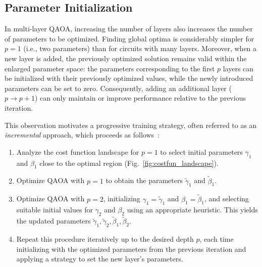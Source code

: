 \subsection{Parameter Initialization}
\label{Section:IncrementalApproach}

In multi-layer QAOA, increasing the number of layers also increases the number of parameters to be optimized. Finding global optima is considerably simpler for $p=1$ (i.e., two parameters) than for circuits with many layers. Moreover, when a new layer is added, the previously optimized solution remains valid within the enlarged parameter space: the parameters corresponding to the first $p$ layers can be initialized with their previously optimized values, while the newly introduced parameters can be set to zero. Consequently, adding an additional layer ($p \rightarrow p+1$) can only maintain or improve performance relative to the previous iteration.

This observation motivates a progressive training strategy, often referred to as an \emph{incremental} approach, which proceeds as follows~\cite{zhou_quantum_2020}:
\begin{enumerate}
    \item Analyze the cost function landscape for $p=1$ to select initial parameters $\gamma_1$ and $\beta_1$ close to the optimal region (Fig.~\ref{fig:costfun_landscape}).
    \item Optimize QAOA with $p=1$ to obtain the parameters $\widetilde{\gamma}_1$ and $\widetilde{\beta}_1$.
    \item Optimize QAOA with $p=2$, initializing $\gamma_1=\widetilde{\gamma}_1$ and $\beta_1=\widetilde{\beta}_1$, and selecting suitable initial values for $\gamma_2$ and $\beta_2$ using an appropriate heuristic. This yields the updated parameters $\widetilde{\gamma}_1, \widetilde{\gamma}_2, \widetilde{\beta}_1, \widetilde{\beta}_2$.
    \item Repeat this procedure iteratively up to the desired depth $p$, each time initializing
    with the optimized parameters from the previous iteration and applying a strategy to set
    the new layer's parameters.
\end{enumerate}

